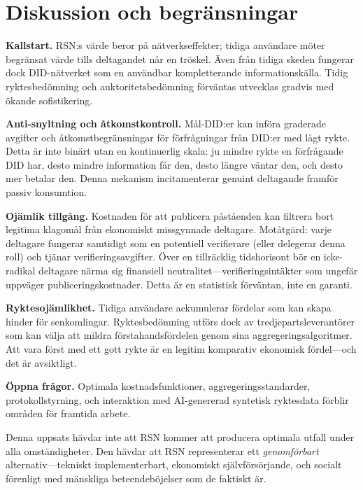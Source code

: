 \documentclass[11pt,a4paper,twocolumn]{article}
\begin{document}
\section{Diskussion och begränsningar}

\textbf{Kallstart.} RSN:s värde beror på nätverkseffekter; tidiga användare möter begränsat värde tills deltagandet når en tröskel. Även från tidiga skeden fungerar dock DID-nätverket som en användbar kompletterande informationskälla. Tidig ryktesbedömning och auktoritetsbedömning förväntas utvecklas gradvis med ökande sofistikering.

\textbf{Anti-snyltning och åtkomstkontroll.} Mål-DID:er kan införa graderade avgifter och åtkomstbegränsningar för förfrågningar från DID:er med lågt rykte. Detta är inte binärt utan en kontinuerlig skala: ju mindre rykte en förfrågande DID har, desto mindre information får den, desto längre väntar den, och desto mer betalar den. Denna mekanism incitamenterar genuint deltagande framför passiv konsumtion.

\textbf{Ojämlik tillgång.} Kostnaden för att publicera påståenden kan filtrera bort legitima klagomål från ekonomiskt missgynnade deltagare. Motåtgärd: varje deltagare fungerar samtidigt som en potentiell verifierare (eller delegerar denna roll) och tjänar verifieringsavgifter. Över en tillräcklig tidshorisont bör en icke-radikal deltagare närma sig finansiell neutralitet---verifieringsintäkter som ungefär uppväger publiceringskostnader. Detta är en statistisk förväntan, inte en garanti.

\textbf{Ryktesojämlikhet.} Tidiga användare ackumulerar fördelar som kan skapa hinder för senkomlingar. Ryktesbedömning utförs dock av tredjepartsleverantörer som kan välja att mildra förstahandsfördelen genom sina aggregeringsalgoritmer. Att vara först med ett gott rykte är en legitim komparativ ekonomisk fördel---och det är avsiktligt.

\textbf{Öppna frågor.} Optimala kostnadsfunktioner, aggregeringsstandarder, protokollstyrning, och interaktion med AI-genererad syntetisk ryktesdata förblir områden för framtida arbete.

Denna uppsats hävdar inte att RSN kommer att producera optimala utfall under alla omständigheter. Den hävdar att RSN representerar ett \emph{genomförbart} alternativ---tekniskt implementerbart, ekonomiskt självförsörjande, och socialt förenligt med mänskliga beteendeböjelser som de faktiskt är.
\end{document}
